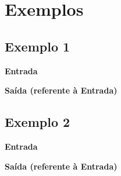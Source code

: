 \documentclass[a4paper,11pt]{article}
\begin{document}
\section{Exemplos}
\begin{samepage}
\subsection*{Exemplo 1}
\bf{Entrada}

\bf{Saída} (referente à Entrada)

\end{samepage}
\begin{samepage}
\subsection*{Exemplo 2}
\bf{Entrada}

\bf{Saída} (referente à Entrada)

\end{samepage}


\end{document}
